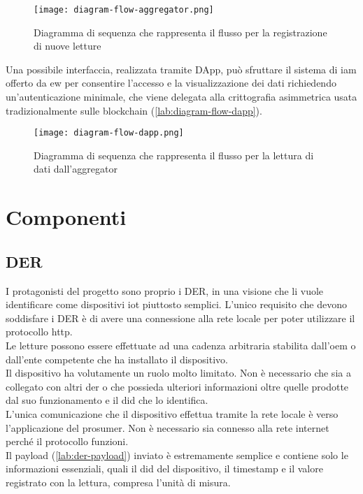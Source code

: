 \begin{figure}[H]
    \texttt{[image: diagram-flow-aggregator.png]}
    \centering
    \caption{Diagramma di sequenza che rappresenta il flusso per la registrazione di nuove letture}
    \label{lab:diagram-flow-aggregator}
\end{figure}

Una possibile interfaccia, realizzata tramite DApp, può sfruttare il sistema di \gls{iam} offerto da \gls{ew}
per consentire l'accesso e la visualizzazione dei dati richiedendo un'autenticazione minimale,
che viene delegata alla crittografia asimmetrica usata tradizionalmente sulle blockchain (\autoref{lab:diagram-flow-dapp}). \\


\begin{figure}[H]
    \texttt{[image: diagram-flow-dapp.png]}
    \centering
    \caption{Diagramma di sequenza che rappresenta il flusso per la lettura di dati dall'\gls{aggregator}}
    \label{lab:diagram-flow-dapp}
\end{figure}


\section{Componenti}

\subsection{DER}
I protagonisti del progetto sono proprio i DER, in una visione che li vuole identificare come dispositivi \gls{iot} piuttosto semplici.
L'unico requisito che devono soddisfare i DER è di avere una connessione alla rete locale per poter utilizzare il protocollo \gls{http}. \\
Le letture possono essere effettuate ad una cadenza arbitraria stabilita dall'\gls{oem} o dall'ente competente che ha installato il dispositivo. \\
Il dispositivo ha volutamente un ruolo molto limitato. Non è necessario che sia a collegato con altri \gls{der}
o che possieda ulteriori informazioni oltre quelle prodotte dal suo funzionamento e il \gls{did} che lo identifica. \\
L'unica comunicazione che il dispositivo effettua tramite la rete locale è verso l'applicazione del \gls{prosumer}.
Non è necessario sia connesso alla rete internet perché il protocollo funzioni. \\
Il payload (\autoref{lab:der-payload}) inviato è estremamente semplice e contiene solo le informazioni essenziali,
quali il \gls{did} del dispositivo, il timestamp e il valore registrato con la lettura, compresa l'unità di misura. \\

